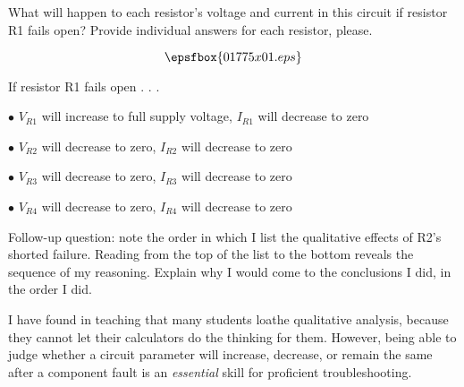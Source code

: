 

What will happen to each resistor's voltage and current in this circuit if resistor R1 fails open?  Provide individual answers for each resistor, please.

$$\epsfbox{01775x01.eps}$$







If resistor R1 fails open . . .

\medskip
\item{$\bullet$} $V_{R1}$ will increase to full supply voltage, $I_{R1}$ will decrease to zero
\item{$\bullet$} $V_{R2}$ will decrease to zero, $I_{R2}$ will decrease to zero
\item{$\bullet$} $V_{R3}$ will decrease to zero, $I_{R3}$ will decrease to zero
\item{$\bullet$} $V_{R4}$ will decrease to zero, $I_{R4}$ will decrease to zero
\medskip

\vskip 10pt

Follow-up question: note the order in which I list the qualitative effects of R2's shorted failure.  Reading from the top of the list to the bottom reveals the sequence of my reasoning.  Explain why I would come to the conclusions I did, in the order I did.







I have found in teaching that many students loathe qualitative analysis, because they cannot let their calculators do the thinking for them.  However, being able to judge whether a circuit parameter will increase, decrease, or remain the same after a component fault is an {\it essential} skill for proficient troubleshooting.




